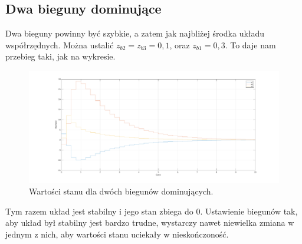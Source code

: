 \subsection{Dwa bieguny dominujące}
Dwa bieguny powinny być szybkie, a zatem jak najbliżej środka układu współrzędnych.
Można ustalić $z_{b2} = z_{b3} = 0,1$, oraz $z_{b1} = 0,3$.
To daje nam przebieg taki, jak na wykresie.
\begin{figure}[H]
\centering
 \includegraphics[width=\textwidth]{img/plot5_2.pdf}
\caption{Wartości stanu dla dwóch biegunów dominujących.}
\end{figure}
Tym razem układ jest stabilny i jego stan zbiega do 0.
Ustawienie biegunów tak, aby układ był stabilny jest bardzo trudne, wystarczy nawet niewielka zmiana w jednym z nich, aby wartości stanu uciekały w nieskończoność.

